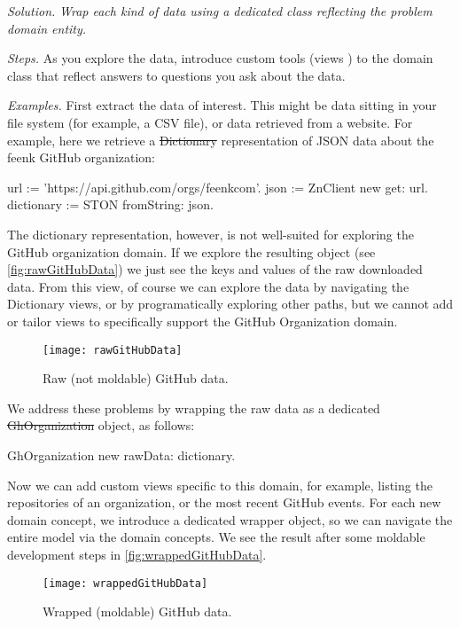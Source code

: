 \documentclass[sigconf,screen]{acmart}
\newcommand\eog[1]{\nbc{Edward}{#1}{purple}}
\newcommand\cp[1]{\nbe{Cesare}{#1}{olive}} %
\newcommand{\patsec}[1]{\noindent\textit{#1.}\xspace}
\begin{document}
\patsec{Solution}
\emph{Wrap each kind of data using a dedicated class reflecting the problem domain entity.}

\patsec{Steps}
As you explore the data, introduce custom tools (views \etc) to the domain class that reflect answers to questions you ask about the data.

\patsec{Examples}
First extract the data of interest.
This might be data sitting in your file system (for example, a CSV file), or data retrieved from a website.
For example, here we retrieve a \st{Dictionary} representation of JSON data about the feenk GitHub organization:

\begin{code}
url := 'https://api.github.com/orgs/feenkcom'.
json := ZnClient new get: url.
dictionary := STON fromString: json.
\end{code}


The dictionary representation, however, is not well-suited for exploring the GitHub organization domain.
If we explore the resulting object (see \autoref{fig:rawGitHubData}) we just see the keys and values of the raw downloaded data.
From this view, of course we can explore the data by navigating the Dictionary views, or by programatically exploring other paths, but we cannot add or tailor views to specifically support the GitHub Organization domain.

\begin{figure}[h]
  \texttt{[image: rawGitHubData]}
  \caption{Raw (not moldable) GitHub data.}
  \label{fig:rawGitHubData}
\end{figure}

We address these problems by wrapping the raw data as a dedicated \st{GhOrganization} object, as follows:
\begin{code}
GhOrganization new rawData: dictionary.
\end{code}

Now we can add custom views specific to this domain, for example, listing the repositories of an organization, or the most recent GitHub events.
For each new domain concept, we introduce a dedicated wrapper object, so we can navigate the entire model via the domain concepts.
We see the result after some moldable development steps in \autoref{fig:wrappedGitHubData}.
\begin{figure}[h]
  \texttt{[image: wrappedGitHubData]}
  \caption{Wrapped (moldable) GitHub data.}
  \label{fig:wrappedGitHubData}
\end{figure}
\end{document}
